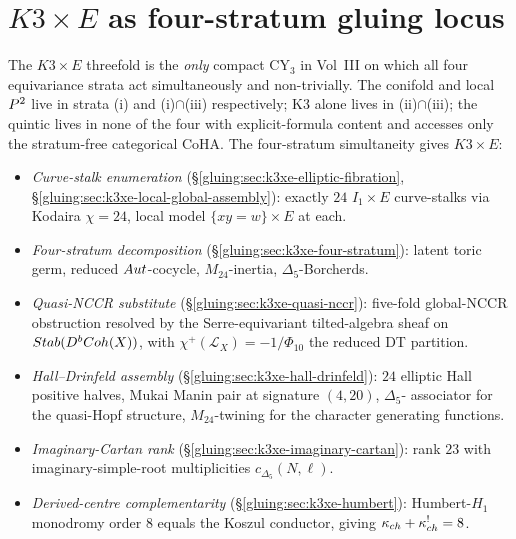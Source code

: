 \section{$K3 \times E$ as four-stratum gluing locus}
\label{gluing:sec:k3xe-synthesis}

The $K3 \times E$ threefold is the \emph{only} compact CY$_3$ in
Vol~III on which all four equivariance strata act simultaneously and
non-trivially. The conifold and local $P^2$ live in strata (i)
and (i)$\cap$(iii) respectively; K3 alone lives in (ii)$\cap$(iii);
the quintic lives in none of the four with explicit-formula content
and accesses only the stratum-free categorical CoHA. The four-stratum
simultaneity gives $K3 \times E$:
\begin{itemize}
 \item \emph{Curve-stalk enumeration} (\S\ref{gluing:sec:k3xe-elliptic-fibration},
 \S\ref{gluing:sec:k3xe-local-global-assembly}): exactly $24$
 $I_1 \times E$ curve-stalks via Kodaira $\chi = 24$, local model
 $\{xy = w\} \times E$ at each.
 \item \emph{Four-stratum decomposition}
 (\S\ref{gluing:sec:k3xe-four-stratum}): latent toric germ, reduced
 $Aut$-cocycle, $M_{24}$-inertia, $\Delta_5$-Borcherds.
 \item \emph{Quasi-NCCR substitute}
 (\S\ref{gluing:sec:k3xe-quasi-nccr}): five-fold global-NCCR
 obstruction resolved by the Serre-equivariant tilted-algebra sheaf
 on $Stab(D^bCoh(X))$, with $\chi^+(\mathscr{L}_X) =
 -1/\Phi_{10}$ the reduced DT partition.
 \item \emph{Hall--Drinfeld assembly}
 (\S\ref{gluing:sec:k3xe-hall-drinfeld}): $24$ elliptic Hall
 positive halves, Mukai Manin pair at signature $(4, 20)$, $\Delta_5$-
 associator for the quasi-Hopf structure, $M_{24}$-twining for the
 character generating functions.
 \item \emph{Imaginary-Cartan rank}
 (\S\ref{gluing:sec:k3xe-imaginary-cartan}): rank $23$ with
 imaginary-simple-root multiplicities $c_{\Delta_5}(N, \ell)$.
 \item \emph{Derived-centre complementarity}
 (\S\ref{gluing:sec:k3xe-humbert}): Humbert-$H_1$ monodromy order $8$
 equals the Koszul conductor, giving $\kappa_{ch} + \kappa_{ch}^! = 8$.
\end{itemize}

